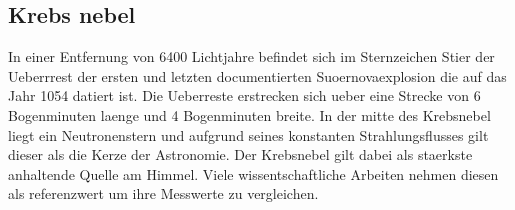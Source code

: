 \subsection{Krebs nebel}
In einer Entfernung von 6400 Lichtjahre befindet sich im Sternzeichen Stier der Ueberrrest der ersten und letzten documentierten Suoernovaexplosion die auf das Jahr 1054 datiert ist. Die Ueberreste erstrecken sich ueber eine Strecke von 6 Bogenminuten laenge und 4 Bogenminuten breite. In der mitte des Krebsnebel liegt ein Neutronenstern und aufgrund seines konstanten Strahlungsflusses gilt dieser als die Kerze der Astronomie. Der Krebsnebel gilt dabei als staerkste anhaltende Quelle am Himmel. Viele wissentschaftliche Arbeiten nehmen diesen als referenzwert um ihre Messwerte zu vergleichen. 
